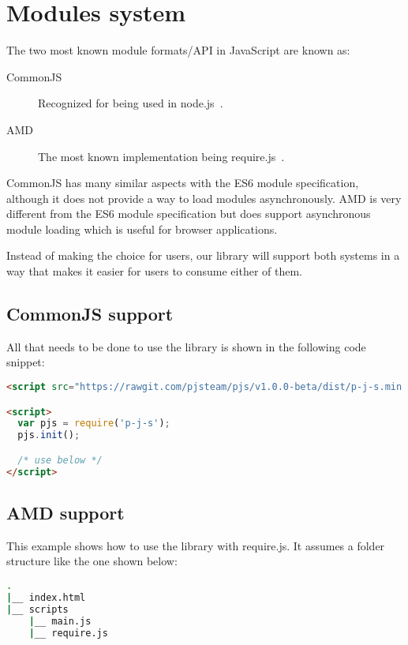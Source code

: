 \section{Modules system}


The two most known module formats/API in JavaScript are known as:
\begin{description}
\item[CommonJS] Recognized for being used in node.js~\cite{nodejs}.
\item[AMD~\cite{amd}] The most known implementation being require.js~\cite{requirejs}.
\end{description}

CommonJS has many similar aspects with the ES6 module specification, although it does not provide a way to load modules asynchronously. AMD is very different from the ES6 module specification but does support asynchronous module loading which is useful for browser applications.

Instead of making the choice for users, our library will support both systems in a way that makes it easier for users to consume either of them.

\subsection{CommonJS support}
All that needs to be done to use the library is shown in the following code snippet:
\begin{lstlisting}[language=HTML, caption=CommonJS usage]
<script src="https://rawgit.com/pjsteam/pjs/v1.0.0-beta/dist/p-j-s.min.js"></script>

<script>
  var pjs = require('p-j-s');
  pjs.init();

  /* use below */
</script>
\end{lstlisting}

\subsection{AMD support}
This example shows how to use the library with require.js. It assumes a folder structure like the one shown below:
\begin{lstlisting}[language=bash, caption=AMD folder structure]
.
|__ index.html
|__ scripts
    |__ main.js
    |__ require.js
\end{lstlisting}

